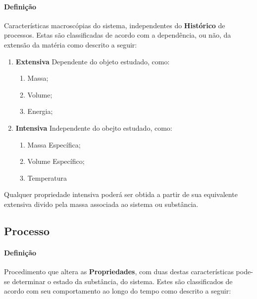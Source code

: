 \documentclass{article}
\begin{document}
            \paragraph{Definição}Características macroscópias do sistema, independentes do \textbf{Histórico} de processos. Estas são classificadas de acordo com a dependência, ou não, da extensão da matéria como descrito a seguir:
                \begin{enumerate}[noitemsep]
                    \item \textbf{Extensiva} Dependente do objeto estudado, como:
                        \begin{enumerate}[noitemsep]
                            \item Massa;
                            \item Volume;
                            \item Energia;
                        \end{enumerate}
                    \item \textbf{Intensiva} Independente do obejto estudado, como:
                        \begin{enumerate}[noitemsep]
                            \item Massa Específica;
                            \item Volume Específico;
                            \item Temperatura
                        \end{enumerate}
                \end{enumerate}
            Qualquer propriedade intensiva poderá ser obtida a partir de sua equivalente extensiva divido pela massa associada ao sistema ou substância.

        \subsection{Processo}
            \paragraph{Definição}Procedimento que altera as \textbf{Propriedades}, com duas destas características pode-se determinar o estado da substância, do sistema. Estes são classificados de acordo com seu comportamento ao longo do tempo como descrito a seguir:
\end{document}
